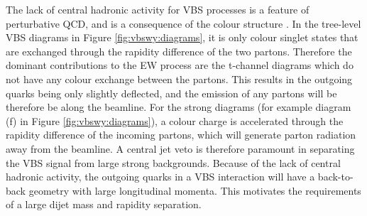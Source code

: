 The lack of central hadronic activity for VBS processes is a feature of perturbative QCD, and is a  consequence of the colour structure \cite{Plehn:2009nd}. In the tree-level VBS diagrams in Figure \ref{fig:vbswy:diagrams}, it is only colour singlet states that are exchanged through the rapidity difference of the two partons. Therefore the dominant contributions to the EW process are the t-channel diagrams which do not have any colour exchange between the partons. This results in the outgoing quarks being only slightly deflected, and the emission of any partons will be therefore be along the beamline. For the strong diagrams (for example diagram (f) in Figure \ref{fig:vbswy:diagrams}), a colour charge is accelerated through the rapidity difference of the incoming partons, which will generate parton radiation away from the beamline. A central jet veto is therefore paramount in separating the VBS signal from large strong backgrounds. Because of the lack of central hadronic activity, the outgoing quarks in a VBS interaction will have a back-to-back geometry with large longitudinal momenta. This motivates the requirements of a large dijet mass and rapidity separation. 


%
%
%

